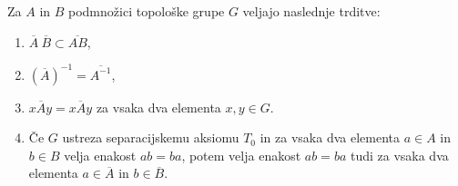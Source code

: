 \documentclass[mat1]{fmfdelo}
\newcommand{\closure}[1]{\overline{#1}}
\begin{document}
\begin{trditev}\label{trd:zaprtost}
	Za $A$ in $B$ podmnožici topološke grupe $G$ veljajo naslednje trditve:
	\begin{enumerate}
		\item $\closure{A}\ \closure{B} \subset \closure{A B}$,\label{podtrd:zap1}
		\item $(\closure{A})^{-1} = \closure{A^{-1}}$,\label{podtrd:zap2}
		\item $x \closure{A} y = \closure{x A y}$ za vsaka dva elementa $x, y \in G$.\label{podtrd:zap3}
		
		\item Če $G$ ustreza separacijskemu aksiomu $T_0$ in za vsaka dva elementa $a \in A$ in $b \in B$ velja enakost $ab = ba$, potem velja enakost $ab = ba$ tudi za vsaka dva elementa $a \in \closure{A}$ in $b \in \closure{B}$.\label{podtrd:zap4}
	\end{enumerate}
\end{trditev}
\end{document}
